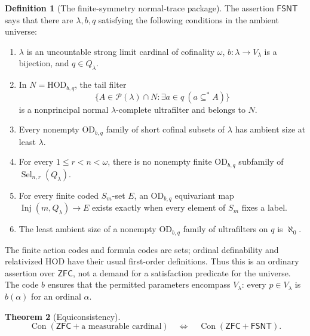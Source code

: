 \documentclass[11pt,letterpaper]{article}
\theoremstyle{definition}
\newtheorem{definition}{Definition}[section]
\newtheorem{theorem}[definition]{Theorem}
\numberwithin{equation}{section}
\newcommand{\ZFC}{\mathsf{ZFC}}
\newcommand{\HOD}{\mathrm{HOD}}
\newcommand{\OD}{\mathrm{OD}}
\newcommand{\Con}{\operatorname{Con}}
\newcommand{\Pow}{\mathcal P}
\newcommand{\Sel}{\operatorname{Sel}}
\newcommand{\FinSym}{\mathsf{FSNT}}
\newcommand{\Inj}{\operatorname{Inj}}
\begin{document}
\begin{definition}[The finite-symmetry normal-trace package]
The assertion $\FinSym$ says that there are $\lambda,b,q$ satisfying the following conditions in the ambient universe:
\begin{enumerate}
\item $\lambda$ is an uncountable strong limit cardinal of cofinality $\omega$, $b:\lambda\to V_\lambda$ is a bijection, and $q\in Q_\lambda$.
\item In $N=\HOD_{b,q}$, the tail filter
\[
 \{A\in\Pow(\lambda)\cap N:\exists a\in q\ (a\subseteq^* A)\}
\]
is a nonprincipal normal $\lambda$-complete ultrafilter and belongs to $N$.
\item Every nonempty $\OD_{b,q}$ family of short cofinal subsets of $\lambda$ has ambient size at least $\lambda$.
\item For every $1\le r<n<\omega$, there is no nonempty finite $\OD_{b,q}$ subfamily of $\Sel_{n,r}(Q_\lambda)$.
\item For every finite coded $S_m$-set $E$, an $\OD_{b,q}$ equivariant map $\Inj(m,Q_\lambda)\to E$ exists exactly when every element of $S_m$ fixes a label.
\item The least ambient size of a nonempty $\OD_{b,q}$ family of ultrafilters on $q$ is $\aleph_0$.
\end{enumerate}
\end{definition}

The finite action codes and formula codes are sets; ordinal definability and relativized HOD have their usual first-order definitions. Thus this is an ordinary assertion over $\ZFC$, not a demand for a satisfaction predicate for the universe. The code $b$ ensures that the permitted parameters encompass $V_\lambda$: every $p\in V_\lambda$ is $b(\alpha)$ for an ordinal $\alpha$.

\begin{theorem}[Equiconsistency]\label{thm:equiconsistency}
\[
 \Con(\ZFC+\text{a measurable cardinal})
 \quad\Longleftrightarrow\quad
 \Con(\ZFC+\FinSym).
\]
\end{theorem}
\end{document}
